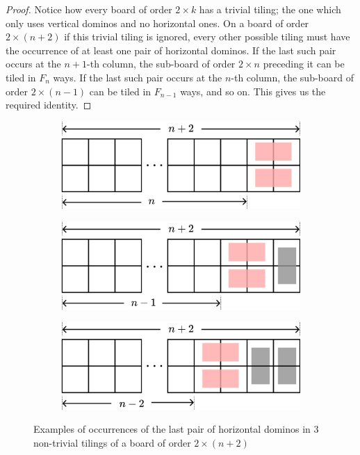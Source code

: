 \begin{proof}	
Notice how every board of order $2\times k$ has a trivial tiling; the one which only uses vertical dominos and no horizontal ones. On a board of order $2\times \left( n+2 \right)$ if this trivial tiling is ignored, every other possible tiling must have the occurrence of at least one pair of horizontal dominos. If the last such pair occurs at the $n+1$-th column, the sub-board of order  $2\times n$ preceding it can be tiled in $F_{n}$ ways. If the last such pair occurs at the $n$-th column, the sub-board of order $2\times \left( n-1 \right)$ can be tiled in $F_{n-1}$ ways, and so on. This gives us the required identity. 
\end{proof}
\begin{figure}[H]
		\centering
		\begin{subfigure}[b]{0.3\textwidth}
			\centering
			\includegraphics[scale=0.6]{Images/Figure7_1.png}
			\caption{}
		\end{subfigure}
		\vfill
		\begin{subfigure}[b]{0.3\textwidth}
			\centering
			\includegraphics[scale=0.6]{Images/Figure7_2.png}
			\caption{}
		\end{subfigure}
		\vfill
		\begin{subfigure}[b]{0.3\textwidth}
			\centering
			\includegraphics[scale=0.6]{Images/Figure7_3.png}
			\caption{}
		\end{subfigure}
\caption{Examples of occurrences of the last pair of horizontal dominos in $3$ non-trivial tilings of a board of order $2\times \left( n+2 \right)$}
\label{f:1.7}
\end{figure}


